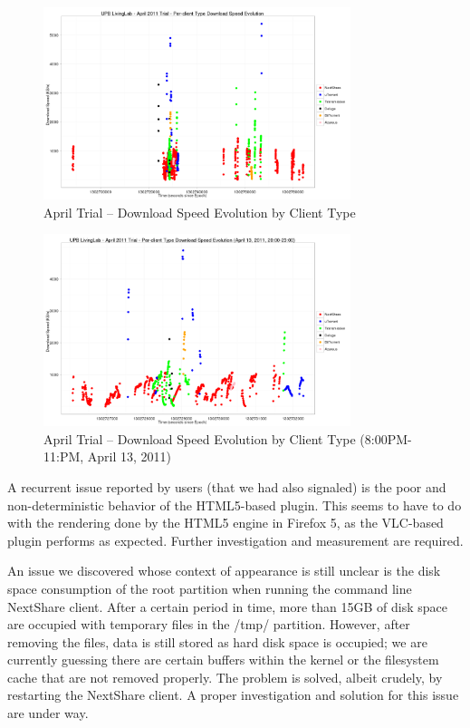 \begin{figure}
  \centering
  \includegraphics[width=0.8\textwidth]{src/img/multimedia-dist/ds-evolution-full}
  \caption{April Trial -- Download Speed Evolution by Client Type}
  \label{fig:multimedia-dist:ds-evolution-full}
\end{figure}

\begin{figure}
  \centering
  \includegraphics[width=0.8\textwidth]{src/img/multimedia-dist/ds-evolution-day}
  \caption{April Trial -- Download Speed Evolution by Client Type
  (8:00PM-11:PM, April 13, 2011)}
  \label{fig:multimedia-dist:ds-evolution-day}
\end{figure}

A recurrent issue reported by users (that we had also signaled) is the poor
and non-deterministic behavior of the HTML5-based plugin. This seems to have
to do with the rendering done by the HTML5 engine in Firefox 5, as the
VLC-based plugin performs as expected. Further investigation and measurement
are required.

An issue we discovered whose context of appearance is still unclear is the
disk space consumption of the root partition when running the command line
NextShare client. After a certain period in time, more than 15GB of disk space
are occupied with temporary files in the /tmp/ partition. However, after
removing the files, data is still stored as hard disk space is occupied; we
are currently guessing there are certain buffers within the kernel or the
filesystem cache that are not removed properly. The problem is solved, albeit
crudely, by restarting the NextShare client. A proper investigation and
solution for this issue are under way.

